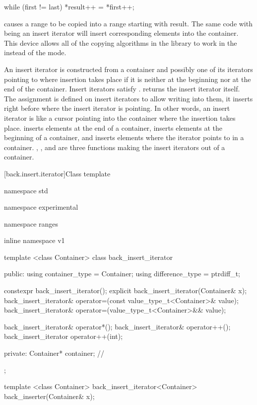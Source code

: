 \begin{codeblock}
while (first != last) *result++ = *first++;
\end{codeblock}

causes a range 
to be copied into a range starting with result.
The same code with
being an insert iterator will insert corresponding elements into the container.
This device allows all of the
copying algorithms in the library to work in the
instead of the  mode.

\pnum
An insert iterator is constructed from a container and possibly one of its iterators pointing to where
insertion takes place if it is neither at the beginning nor at the end of the container.
Insert iterators satisfy .
returns the insert iterator itself.
The assignment
is defined on insert iterators to allow writing into them, it inserts
right before where the insert iterator is pointing.
In other words, an insert iterator is like a cursor pointing into the
container where the insertion takes place.
inserts elements at the end of a container,
inserts elements at the beginning of a container, and
inserts elements where the iterator points to in a container.
,
,
and
are three
functions making the insert iterators out of a container.

[back.insert.iterator]{Class template }

%
\begin{codeblock}
namespace std { namespace experimental { namespace ranges { inline namespace v1 {
  template <class Container>
  class back_insert_iterator {
  public:
    using container_type = Container;
    using difference_type = ptrdiff_t;

    constexpr back_insert_iterator();
    explicit back_insert_iterator(Container& x);
    back_insert_iterator&
      operator=(const value_type_t<Container>& value);
    back_insert_iterator&
      operator=(value_type_t<Container>&& value);

    back_insert_iterator& operator*();
    back_insert_iterator& operator++();
    back_insert_iterator operator++(int);

  private:
    Container* container; // \expos
  };

  template <class Container>
    back_insert_iterator<Container> back_inserter(Container& x);
}}}}
\end{codeblock}

